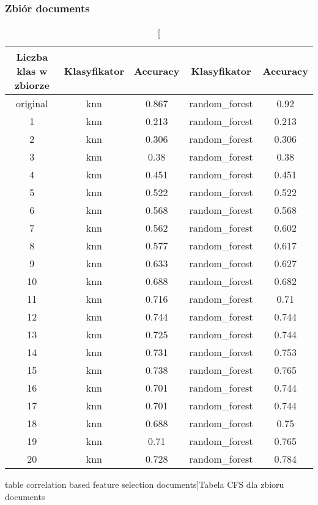 \documentclass{classrep}
\begin{document}
{{            \subsubsection{Zbiór documents} {
            \begin{table}[!htbp]
\centering
\begin{tabular}{|c|c|c|c|c|}
\hline
Liczba klas w zbiorze & Klasyfikator & Accuracy & Klasyfikator & Accuracy \\ \hline
original & knn & 0.867 & random\_forest & 0.92 \\ \hline
1 & knn & 0.213 & random\_forest & 0.213 \\ \hline
2 & knn & 0.306 & random\_forest & 0.306 \\ \hline
3 & knn & 0.38 & random\_forest & 0.38 \\ \hline
4 & knn & 0.451 & random\_forest & 0.451 \\ \hline
5 & knn & 0.522 & random\_forest & 0.522 \\ \hline
6 & knn & 0.568 & random\_forest & 0.568 \\ \hline
7 & knn & 0.562 & random\_forest & 0.602 \\ \hline
8 & knn & 0.577 & random\_forest & 0.617 \\ \hline
9 & knn & 0.633 & random\_forest & 0.627 \\ \hline
10 & knn & 0.688 & random\_forest & 0.682 \\ \hline
11 & knn & 0.716 & random\_forest & 0.71 \\ \hline
12 & knn & 0.744 & random\_forest & 0.744 \\ \hline
13 & knn & 0.725 & random\_forest & 0.744 \\ \hline
14 & knn & 0.731 & random\_forest & 0.753 \\ \hline
15 & knn & 0.738 & random\_forest & 0.765 \\ \hline
16 & knn & 0.701 & random\_forest & 0.744 \\ \hline
17 & knn & 0.701 & random\_forest & 0.744 \\ \hline
18 & knn & 0.688 & random\_forest & 0.75 \\ \hline
19 & knn & 0.71 & random\_forest & 0.765 \\ \hline
20 & knn & 0.728 & random\_forest & 0.784 \\ \hline
\end{tabular}
\caption
[table correlation based feature selection documents]{Tabela CFS dla zbioru documents}
\label{table_correlation_based_feature_selection_documents}
\end{table}
\FloatBarrier

            }
        }

    }
\end{document}

